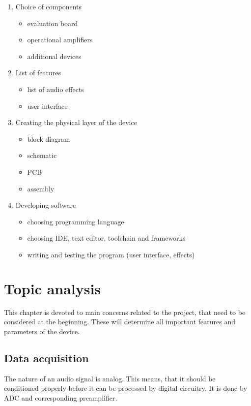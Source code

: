 \documentclass[a4paper,twoside,12pt]{book}
\begin{document}
\begin{enumerate}
    \item Choice of components
    \begin{itemize}
        \item evaluation board
        \item operational amplifiers
        \item additional devices
    \end{itemize}

    \item List of features
    \begin{itemize}
        \item list of audio effects
        \item user interface
    \end{itemize}

    \item Creating the physical layer of the device
    \begin{itemize}
        \item block diagram
        \item schematic
        \item PCB
        \item assembly 
    \end{itemize}

    \item Developing software
    \begin{itemize}
        \item choosing programming language
        \item choosing IDE, text editor, toolchain and frameworks
        \item writing and testing the program (user interface, effects)
    \end{itemize}
\end{enumerate}




\chapter{Topic analysis}\label{ch:analysis}
This chapter is devoted to main concerns related to the project,
that need to be considered at the beginning.
These will determine all important features and parameters of the device.

\section{Data acquisition}
The nature of an audio signal is analog. This means,
that it should be conditioned properly before it can be processed by digital circuitry.
It is done by ADC and corresponding preamplifier.
\end{document}
